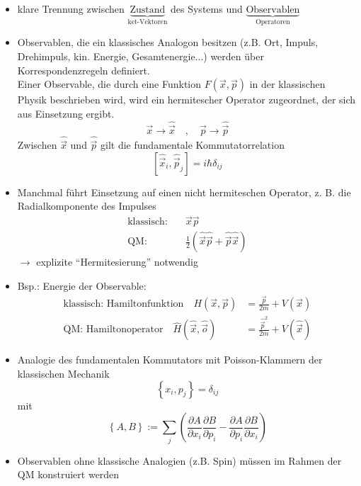 \documentclass[10pt,article,colorback,accentcolor=tud9d]{scrartcl}
\begin{document}
    \begin{itemize}
      \item klare Trennung zwischen $\underbrace{\text{Zustand}}_{\text{ket-Vektoren}}$ des Systems und $\underbrace{\text{Observablen}}_{\text{Operatoren}}$
      \item Observablen, die ein klassisches Analogon besitzen (z.B. Ort, Impuls, Drehimpuls, kin. Energie, Gesamtenergie...) werden über Korrespondenzregeln definiert. \\
        Einer Observable, die durch eine Funktion $F(\vec{x},\vec{p})$ in der klassischen Physik beschrieben wird, wird ein hermitescher Operator zugeordnet, der sich aus Einsetzung ergibt. 
        $$
        \vec{x} \rightarrow \hat{\vec{x}} \quad, \quad \vec{p} \rightarrow \hat{\vec{p}}
        $$
        Zwischen $\hat{\vec{x}}$ und $\hat{\vec{p}}$ gilt die fundamentale Kommutatorrelation
        \begin{equation}
        \left[\hat{\vec{x}}_i, \hat{\vec{p}}_j\right]=i\hbar\delta_{ij}
        \end{equation}
      \item Manchmal führt Einsetzung auf einen nicht hermiteschen Operator, z. B. die Radialkomponente des Impulses
        \begin{equation}
        \begin{aligned}
          \text{klassisch:} \quad &\vec{x}\vec{p}\\
          \text{QM:} \quad &\frac{1}{2}\left(\hat{\vec{x}}\hat{\vec{p}}+\hat{\vec{p}}\hat{\vec{x}}\right)
        \end{aligned}
        \end{equation}
        $\rightarrow$ explizite "`Hermitesierung"' notwendig
      \item Bsp.: Energie der Observable:
        \begin{equation}
        \begin{aligned}
          \text{klassisch: Hamiltonfunktion} \quad H(\vec{x},\vec{p})&=\frac{\vec{p}}{2m} + V(\vec{x})\\
          \text{QM: Hamiltonoperator} \quad \hat{H}(\hat{\vec{x}},\hat{\vec{o}})&=\frac{\hat{\vec{p}}^2}{2m}+V(\hat{\vec{x}})
        \end{aligned}
        \end{equation}
      \item Analogie des fundamentalen Kommutators mit Poisson-Klammern der klassischen Mechanik
        \begin{equation}
         \left\{x_i,p_j\right\}=\delta_{ij}
        \end{equation}
        mit 
        \begin{equation}
        \left\{A,B\right\}:=\sum_j\left(\frac{\partial A}{\partial x_i}\frac{\partial B}{\partial p_i}-\frac{\partial A}{\partial p_i}\frac{\partial B}{\partial x_i}\right)
        \end{equation}
      \item Observablen ohne klassische Analogien (z.B. Spin) müssen im Rahmen der QM konstruiert werden
    \end{itemize}
\end{document}
